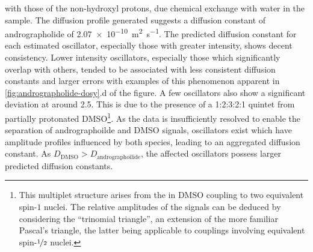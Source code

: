 with those of the non-hydroxyl protons, due chemical exchange with water in the
sample\cite{Chen1998}.
The diffusion profile generated suggests a diffusion constant of andrographolide of
\qty{2.07e-10}{\meter\squared\per\second}. The predicted diffusion constant for
each estimated oscillator, especially those with greater intensity, shows
decent consistency.
Lower intensity oscillators, especially those which
significantly overlap with others, tended to be associated with
less consistent diffusion constants and larger errors with examples of this
phenomenon apparent in \cref{fig:andrographolide-dosy}.d of the figure. A few
oscillators also show a
significant deviation at around \qty{2.5}{\partspermillion}. This is due to the
presence of a 1:2:3:2:1 quintet from partially protonated \acs{DMSO}\footnote{
    This multiplet structure arises from the  in \acs{DMSO} coupling to
    two
    equivalent spin-$1$  nuclei. The relative amplitudes of the signals
    can be deduced by considering the ``trinomial triangle'', an extension of
    the more familiar Pascal's triangle, the latter being applicable to
    couplings involving equivalent spin-$\nicefrac{1}{2}$ nuclei.
}. As the
data is insufficiently resolved to enable the separation of andrographoilde and
\acs{DMSO} signals, oscillators exist which have amplitude profiles
influenced by both species, leading to an aggregated diffusion constant. As
$D_{\text{DMSO}} > D_{\text{andrographoilide}}$, the affected oscillators
possess larger predicted diffusion constants.

